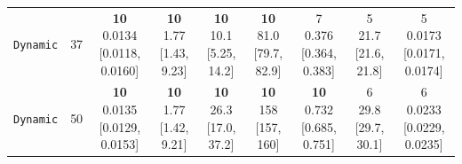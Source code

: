 \begin{tabular}{@{}lrccccccc@{}}
\texttt{Dynamic} & 37 & \makecell{\textbf{10}\\0.0134\\{[0.0118, 0.0160]}} & \makecell{\textbf{10}\\1.77\\{[1.43, 9.23]}} & \makecell{\textbf{10}\\10.1\\{[5.25, 14.2]}} & \makecell{\textbf{10}\\81.0\\{[79.7, 82.9]}} & \makecell{7\\0.376\\{[0.364, 0.383]}} & \makecell{5\\21.7\\{[21.6, 21.8]}} & \makecell{5\\0.0173\\{[0.0171, 0.0174]}} \\
\texttt{Dynamic} & 50 & \makecell{\textbf{10}\\0.0135\\{[0.0129, 0.0153]}} & \makecell{\textbf{10}\\1.77\\{[1.42, 9.21]}} & \makecell{\textbf{10}\\26.3\\{[17.0, 37.2]}} & \makecell{\textbf{10}\\158\\{[157, 160]}} & \makecell{\textbf{10}\\0.732\\{[0.685, 0.751]}} & \makecell{6\\29.8\\{[29.7, 30.1]}} & \makecell{6\\0.0233\\{[0.0229, 0.0235]}} \\
\bottomrule
\end{tabular}

